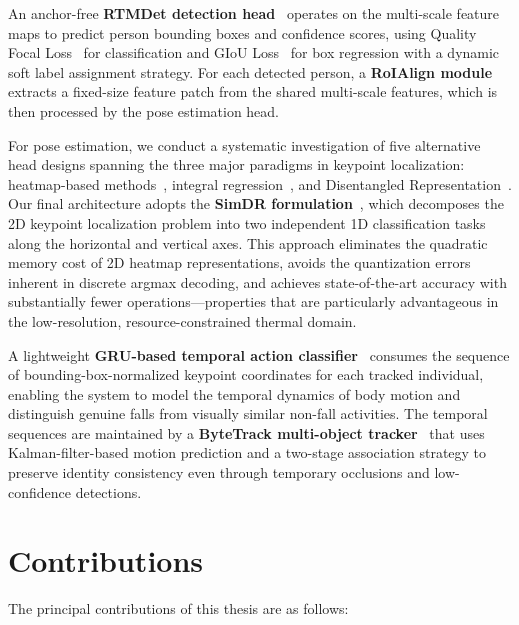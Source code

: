 An anchor-free \textbf{RTMDet detection head}~\cite{lyu2022rtmdet} operates on the multi-scale feature maps to predict person bounding boxes and confidence scores, using Quality Focal Loss~\cite{li2020generalized} for classification and GIoU Loss~\cite{rezatofighi2019generalized} for box regression with a dynamic soft label assignment strategy. For each detected person, a \textbf{RoIAlign module}~\cite{he2017mask} extracts a fixed-size feature patch from the shared multi-scale features, which is then processed by the pose estimation head.

For pose estimation, we conduct a systematic investigation of five alternative head designs spanning the three major paradigms in keypoint localization: heatmap-based methods~\cite{newell2016stacked, xiao2018simple}, integral regression~\cite{sun2018integral, nibali2018numerical}, and Disentangled Representation~\cite{li20212d}. Our final architecture adopts the \textbf{SimDR formulation}~\cite{li20212d}, which decomposes the 2D keypoint localization problem into two independent 1D classification tasks along the horizontal and vertical axes. This approach eliminates the quadratic memory cost of 2D heatmap representations, avoids the quantization errors inherent in discrete argmax decoding, and achieves state-of-the-art accuracy with substantially fewer operations---properties that are particularly advantageous in the low-resolution, resource-constrained thermal domain.

A lightweight \textbf{GRU-based temporal action classifier}~\cite{cho2014learning} consumes the sequence of bounding-box-normalized keypoint coordinates for each tracked individual, enabling the system to model the temporal dynamics of body motion and distinguish genuine falls from visually similar non-fall activities. The temporal sequences are maintained by a \textbf{ByteTrack multi-object tracker}~\cite{zhang2022bytetrack} that uses Kalman-filter-based motion prediction and a two-stage association strategy to preserve identity consistency even through temporary occlusions and low-confidence detections.


\section{Contributions}
\label{sec:intro_contributions}

The principal contributions of this thesis are as follows:


